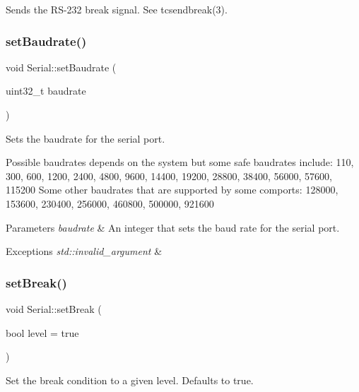 Sends the R\+S-\/232 break signal. See tcsendbreak(3). \mbox{\label{classserial_1_1_serial_ad4f7e9edff11b464199e94a43dfd19bf}} 
\subsubsection{\texorpdfstring{set\+Baudrate()}{setBaudrate()}}
{\footnotesize\ttfamily void Serial\+::set\+Baudrate (\begin{DoxyParamCaption}\item[{uint32\+\_\+t}]{baudrate }\end{DoxyParamCaption})}

Sets the baudrate for the serial port.

Possible baudrates depends on the system but some safe baudrates include\+: 110, 300, 600, 1200, 2400, 4800, 9600, 14400, 19200, 28800, 38400, 56000, 57600, 115200 Some other baudrates that are supported by some comports\+: 128000, 153600, 230400, 256000, 460800, 500000, 921600


\begin{DoxyParams}{Parameters}
{\em baudrate} & An integer that sets the baud rate for the serial port.\\
\hline
\end{DoxyParams}

\begin{DoxyExceptions}{Exceptions}
{\em std\+::invalid\+\_\+argument} & \\
\hline
\end{DoxyExceptions}
\mbox{\label{classserial_1_1_serial_a2a27912b1ca5cdad4a4aba7b9ddbc206}} 
\subsubsection{\texorpdfstring{set\+Break()}{setBreak()}}
{\footnotesize\ttfamily void Serial\+::set\+Break (\begin{DoxyParamCaption}\item[{bool}]{level = {\ttfamily true} }\end{DoxyParamCaption})}

Set the break condition to a given level. Defaults to true. \mbox{\label{classserial_1_1_serial_adba430fd704f6898a5a1d99fd39a94fa}} 

